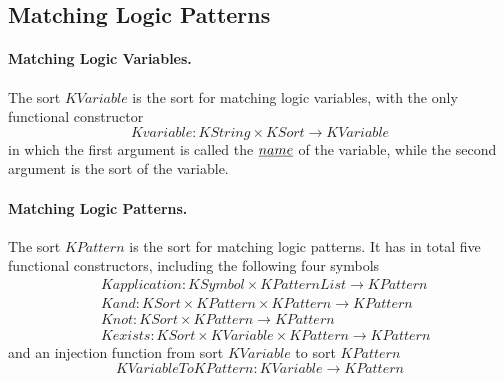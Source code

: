 \documentclass[UTF8,11pt]{article}
\theoremstyle{plain}
\theoremstyle{definition}
\theoremstyle{remark}
\newcommand{\KString}{\mathit{KString}}
\newcommand{\KSort}{\mathit{KSort}}
\newcommand{\KSymbol}{\mathit{KSymbol}}
\newcommand{\KPatternList}{\mathit{KPatternList}}
\newcommand{\KVariable}{\mathit{KVariable}}
\newcommand{\KVariableToKPattern}{\mathit{KVariableToKPattern}}
\newcommand{\KPattern}{\mathit{KPattern}}
\newcommand{\Kvariable}{\mathit{Kvariable}}
\newcommand{\Kand}{\mathit{Kand}}
\newcommand{\Knot}{\mathit{Knot}}
\newcommand{\Kapplication}{\mathit{Kapplication}}
\newcommand{\Kexists}{\mathit{Kexists}}
\begin{document}
\subsection{Matching Logic Patterns}
\label{sec:ML-patterns}

\paragraph{Matching Logic Variables.}
The sort $\KVariable$ is the sort for 
matching logic variables, with the only functional constructor
\begin{equation*}
  \Kvariable \colon \KString \times \KSort \to \KVariable
\end{equation*}
in which the first argument is called the $\emph{name}$ of the variable, while 
the second argument is the sort of the variable.

\paragraph{Matching Logic Patterns.}
The sort $\KPattern$ is the sort for matching logic patterns.
It has in total five functional constructors, including the following four 
symbols
\begin{align*}
  & \Kapplication \colon \KSymbol \times \KPatternList \to \KPattern
  \\
  & \Kand \colon \KSort \times \KPattern \times \KPattern \to \KPattern
  \\
  & \Knot \colon \KSort \times \KPattern \to \KPattern
  \\
  & \Kexists \colon \KSort \times \KVariable \times \KPattern \to \KPattern
\end{align*}
and an injection function from sort $\KVariable$ to sort $\KPattern$
\begin{equation*}
  \KVariableToKPattern \colon \KVariable \to \KPattern
\end{equation*}
\end{document}
